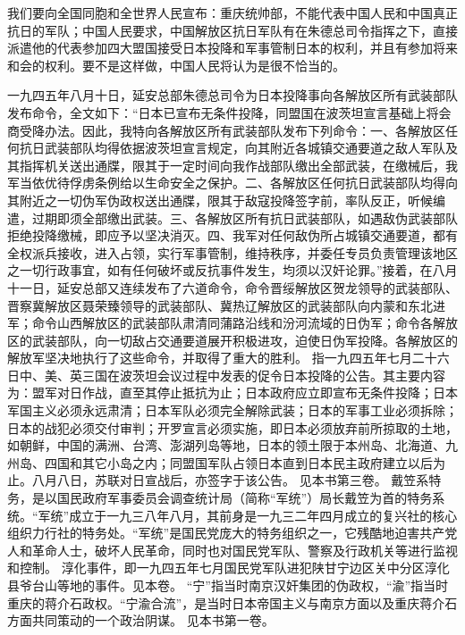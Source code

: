 我们要向全国同胞和全世界人民宣布：重庆统帅部，不能代表中国人民和中国真正抗日的军队；中国人民要求，中国解放区抗日军队有在朱德总司令指挥之下，直接派遣他的代表参加四大盟国接受日本投降和军事管制日本的权利，并且有参加将来和会的权利。要不是这样做，中国人民将认为是很不恰当的。


\begin{maonote}
一九四五年八月十日，延安总部朱德总司令为日本投降事向各解放区所有武装部队发布命令，全文如下：“日本已宣布无条件投降，同盟国在波茨坦宣言基础上将会商受降办法。因此，我特向各解放区所有武装部队发布下列命令：一、各解放区任何抗日武装部队均得依据波茨坦宣言规定，向其附近各城镇交通要道之敌人军队及其指挥机关送出通牒，限其于一定时间向我作战部队缴出全部武装，在缴械后，我军当依优待俘虏条例给以生命安全之保护。二、各解放区任何抗日武装部队均得向其附近之一切伪军伪政权送出通牒，限其于敌寇投降签字前，率队反正，听候编遣，过期即须全部缴出武装。三、各解放区所有抗日武装部队，如遇敌伪武装部队拒绝投降缴械，即应予以坚决消灭。四、我军对任何敌伪所占城镇交通要道，都有全权派兵接收，进入占领，实行军事管制，维持秩序，并委任专员负责管理该地区之一切行政事宜，如有任何破坏或反抗事件发生，均须以汉奸论罪。”接着，在八月十一日，延安总部又连续发布了六道命令，命令晋绥解放区贺龙领导的武装部队、晋察冀解放区聂荣臻领导的武装部队、冀热辽解放区的武装部队向内蒙和东北进军；命令山西解放区的武装部队肃清同蒲路沿线和汾河流域的日伪军；命令各解放区的武装部队，向一切敌占交通要道展开积极进攻，迫使日伪军投降。各解放区的解放军坚决地执行了这些命令，并取得了重大的胜利。
指一九四五年七月二十六日中、美、英三国在波茨坦会议过程中发表的促令日本投降的公告。其主要内容为：盟军对日作战，直至其停止抵抗为止；日本政府应立即宣布无条件投降；日本军国主义必须永远肃清；日本军队必须完全解除武装；日本的军事工业必须拆除；日本的战犯必须交付审判；开罗宣言必须实施，即日本必须放弃前所掠取的土地，如朝鲜，中国的满洲、台湾、澎湖列岛等地，日本的领土限于本州岛、北海道、九州岛、四国和其它小岛之内；同盟国军队占领日本直到日本民主政府建立以后为止。八月八日，苏联对日宣战后，亦签字于该公告。
见本书第三卷。
戴笠系特务，是以国民政府军事委员会调查统计局（简称“军统”）局长戴笠为首的特务系统。“军统”成立于一九三八年八月，其前身是一九三二年四月成立的复兴社的核心组织力行社的特务处。“军统”是国民党庞大的特务组织之一，它残酷地迫害共产党人和革命人士，破坏人民革命，同时也对国民党军队、警察及行政机关等进行监视和控制。
淳化事件，即一九四五年七月国民党军队进犯陕甘宁边区关中分区淳化县爷台山等地的事件。见本卷。
“宁”指当时南京汉奸集团的伪政权，“渝”指当时重庆的蒋介石政权。“宁渝合流”，是当时日本帝国主义与南京方面以及重庆蒋介石方面共同策动的一个政治阴谋。
见本书第一卷。
\end{maonote}
